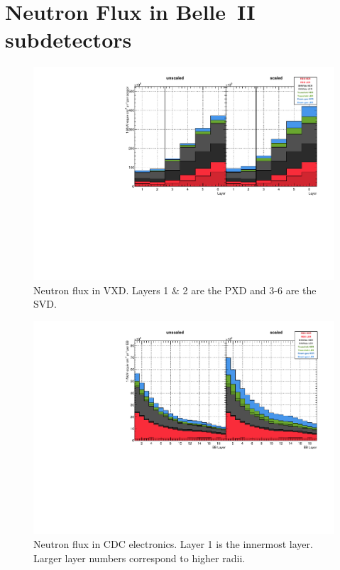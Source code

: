 
\chapter{Neutron Flux in Belle~II subdetectors}
\label{chap:NFluxBelle}

\begin{figure}[htb]
	\centerfloat
		\includegraphics[width=\textwidth]{images/hVXDFlux}
	\caption[Neutron flux in VXD]{Neutron flux in VXD. Layers 1 \& 2 are the PXD and 3-6 are the SVD.}	
	\label{fig:VXDFlux}
\end{figure}

\begin{figure}[htb]
	\centerfloat
		\includegraphics[width=\textwidth]{images/hCDCFlux}
	\caption[Neutron flux in CDC electronics]{Neutron flux in CDC electronics. Layer 1 is the innermost layer. Larger layer numbers correspond to higher radii.}	
	\label{fig:CDCFlux}
\end{figure}

